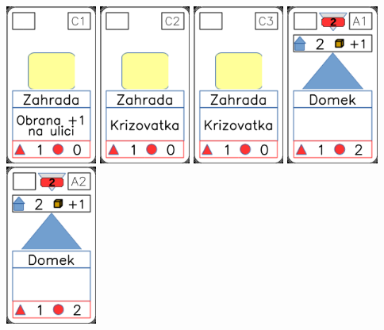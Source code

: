 \documentclass[a4paper]{article}
\begin{document}
	\includegraphics[width=3.0cm]{img-2_25}
	\includegraphics[width=3.0cm]{img-2_26}
	\includegraphics[width=3.0cm]{img-2_27}
	\includegraphics[width=3.0cm]{img-3_0}
	\includegraphics[width=3.0cm]{img-3_1}
\end{document}
